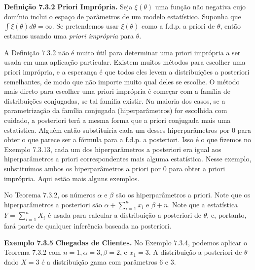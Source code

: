 \noindent\textbf{Definição 7.3.2} \quad \textbf{Priori Imprópria.} Seja $\xi(\theta)$ uma função não negativa cujo domínio inclui o espaço de parâmetros de um modelo estatístico. Suponha que $\int \xi(\theta)d\theta = \infty$. Se pretendemos usar $\xi(\theta)$ como a f.d.p. a priori de $\theta$, então estamos usando uma \textit{priori imprópria} para $\theta$.

A Definição 7.3.2 não é muito útil para determinar uma priori imprópria a ser usada em uma aplicação particular. Existem muitos métodos para escolher uma priori imprópria, e a esperança é que todos eles levem a distribuições a posteriori semelhantes, de modo que não importe muito qual deles se escolhe. O método mais direto para escolher uma priori imprópria é começar com a família de distribuições conjugadas, se tal família existir. Na maioria dos casos, se a parametrização da família conjugada (hiperparâmetros) for escolhida com cuidado, a posteriori terá a mesma forma que a priori conjugada mais uma estatística. Alguém então substituiria cada um desses hiperparâmetros por 0 para obter o que parece ser a fórmula para a f.d.p. a posteriori. Isso é o que fizemos no Exemplo 7.3.13, cada um dos hiperparâmetros a posteriori era igual aos hiperparâmetros a priori correspondentes mais alguma estatística. Nesse exemplo, substituímos ambos os hiperparâmetros a priori por 0 para obter a priori imprópria. Aqui estão mais alguns exemplos.

No Teorema 7.3.2, os números $\alpha$ e $\beta$ são os hiperparâmetros a priori. Note que os hiperparâmetros a posteriori são $\alpha + \sum_{i=1}^{n}x_i$ e $\beta+n$. Note que a estatística $Y=\sum_{i=1}^{n}X_i$ é usada para calcular a distribuição a posteriori de $\theta$, e, portanto, fará parte de qualquer inferência baseada na posteriori.

\vspace{1cm}
\noindent\textbf{Exemplo 7.3.5} \quad \textbf{Chegadas de Clientes.} No Exemplo 7.3.4, podemos aplicar o Teorema 7.3.2 com $n=1, \alpha=3, \beta=2$, e $x_1=3$. A distribuição a posteriori de $\theta$ dado $X=3$ é a distribuição gama com parâmetros 6 e 3.

